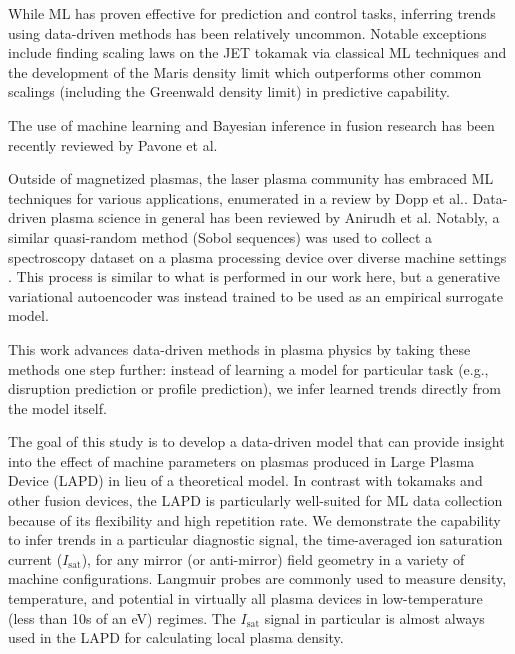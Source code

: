 While ML has proven effective for prediction and control tasks, inferring trends using data-driven methods has been relatively uncommon. Notable exceptions include finding scaling laws on the JET tokamak\cite{murari_investigating_2020} via classical ML techniques and the development of the Maris density limit\cite{maris_correlation_2024} which outperforms other common scalings (including the Greenwald density limit) in predictive capability.

The use of machine learning and Bayesian inference in fusion research has been recently reviewed by Pavone et al.\cite{pavone_machine_2023}

Outside of magnetized plasmas, the laser plasma community has embraced ML techniques for various applications, enumerated in a review by Dopp et al.\cite{dopp_data-driven_2023}. 
Data-driven plasma science in general has been reviewed by Anirudh et al.\cite{anirudh_2022_2023}
Notably, a similar quasi-random method (Sobol sequences) was used to collect a spectroscopy dataset on a plasma processing device over diverse machine settings \cite{daly_data-driven_2023}. This process is similar to what is performed in our work here, but a generative variational autoencoder was instead trained to be used as an empirical surrogate model.

This work advances data-driven methods in plasma physics by taking these methods one step further: instead of learning a model for particular task (e.g., disruption prediction or profile prediction), we infer learned trends directly from the model itself. 

The goal of this study is to develop a data-driven model that can provide insight into the effect of machine parameters on plasmas produced in Large Plasma Device (LAPD) in lieu of a theoretical model. In contrast with tokamaks and other fusion devices, the LAPD is particularly well-suited for ML data collection because of its flexibility and high repetition rate. We demonstrate the capability to infer trends in a particular diagnostic signal, the time-averaged ion saturation current ($I_\text{sat}$), for any mirror (or anti-mirror) field geometry in a variety of machine configurations. Langmuir probes are commonly used to measure density, temperature, and potential in virtually all plasma devices in low-temperature (less than 10s of an eV) regimes. The $I_\text{sat}$ signal in particular is almost always used in the LAPD for calculating local plasma density.


